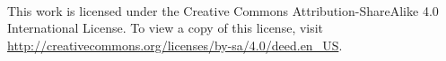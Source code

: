 ~\newpage

\vspace*{\fill}

\noindent%
This work is licensed under the Creative Commons Attribution-ShareAlike 4.0 International
License. To view a copy of this license, visit
\url{http://creativecommons.org/licenses/by-sa/4.0/deed.en_US}.

